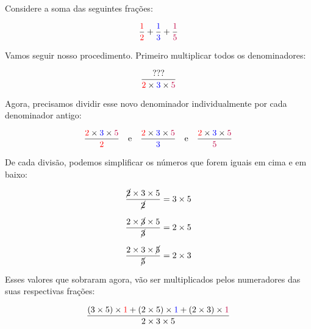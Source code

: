 \begin{exemplo} \label{ex_primeiro_soma_frac}
    Considere a soma das seguintes frações:

    \begin{equation}
        \frac{\textcolor{red}{1}}{\textcolor{red}{2}} + \frac{\textcolor{blue}{1}}{\textcolor{blue}{3}} + \frac{\textcolor{purple}{1}}{\textcolor{purple}{5}}
    \end{equation}

    Vamos seguir nosso procedimento. Primeiro multiplicar todos os denominadores:

    \begin{equation}
        \frac{???}{\textcolor{red}{2}\times\textcolor{blue}{3}\times\textcolor{purple}{5}}
    \end{equation}

    Agora, precisamos dividir esse novo denominador individualmente por cada denominador antigo:

    \begin{equation}
        \frac{\textcolor{red}{2}\times\textcolor{blue}{3}\times\textcolor{purple}{5}}{\textcolor{red}{2}} \quad \text{e} \quad \frac{\textcolor{red}{2}\times\textcolor{blue}{3}\times\textcolor{purple}{5}}{\textcolor{blue}{3}} \quad \text{e} \quad \frac{\textcolor{red}{2}\times\textcolor{blue}{3}\times\textcolor{purple}{5}}{\textcolor{purple}{5}}
    \end{equation}

    De cada divisão, podemos simplificar os números que forem iguais em cima e em baixo:

    \begin{equation}
        \frac{\cancel{2}\times3\times5}{\cancel{2}}=3\times5
    \end{equation}

    \begin{equation}
        \frac{2\times\cancel{3}\times5}{\cancel{3}}=2\times5 
    \end{equation}

    \begin{equation}
        \frac{2\times3\times \cancel{5}}{\cancel{5}}=2\times3 
    \end{equation}

    Esses valores que sobraram agora, vão ser multiplicados pelos numeradores das suas respectivas frações:

    \begin{equation}
        \frac{(3\times5)\times\textcolor{red}{1}+(2\times5)\times \textcolor{blue}{1} + (2\times3)\times \textcolor{purple}{1}}{2\times3\times5}
    \end{equation}


\end{exemplo}

